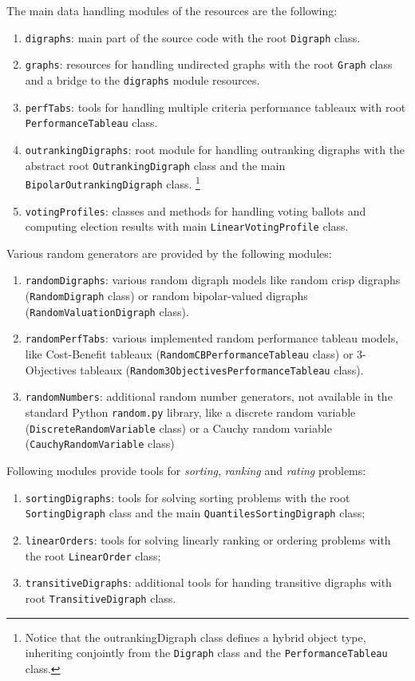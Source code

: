 The main data handling modules of the \Digraph resources are the following:
\begin{enumerate}[leftmargin=0.75cm]
\item \texttt{digraphs}: main part of the \Digraph source code with the root \texttt{Digraph} class.
\item \texttt{graphs}: resources for handling undirected graphs with the root \texttt{Graph} class and a bridge to the \texttt{digraphs} module resources.
\item \texttt{perfTabs}: tools for handling multiple criteria performance tableaux with root \texttt{PerformanceTableau} class.
\item \texttt{outrankingDigraphs}: root module for handling outranking digraphs with the abstract root \texttt{OutrankingDigraph} class and the main \texttt{Bipolar\-OutrankingDigraph} class. \footnote{Notice that the outrankingDigraph class defines a hybrid object type, inheriting conjointly from the \texttt{Digraph} class and the \texttt{PerformanceTableau} class.}
\item \texttt{votingProfiles}: classes and methods for handling voting ballots and computing election results with main \texttt{LinearVotingProfile} class.
\end{enumerate}

\noindent Various random generators are provided by the following modules:
\begin{enumerate}[leftmargin=0.75cm]
\item \texttt{randomDigraphs}: various random digraph models like random crisp digraphs (\texttt{RandomDigraph} class) or random bipolar-valued digraphs (\texttt{Random\-ValuationDigraph} class).
\item \texttt{randomPerfTabs}: various implemented random performance tableau models, like Cost-Benefit tableaux (\texttt{RandomCBPerformance\-Tableau} class) or 3-Objectives tableaux (\texttt{Random3ObjectivesPer\-formance\-Tableau} class).
\item \texttt{randomNumbers}: additional random number generators, not available in the standard Python \texttt{random.py} library, like a discrete random variable (\texttt{DiscreteRandomVariable} class) or a Cauchy random variable (\texttt{Cau\-chy\-RandomVariable} class)
\end{enumerate}

\noindent Following modules provide tools for \emph{sorting}, \emph{ranking} and \emph{rating} problems:
\begin{enumerate}[leftmargin=0.75cm]
\item \texttt{sortingDigraphs}: tools for solving sorting problems with the root \texttt{Sor\-tingDigraph} class and the main \texttt{QuantilesSortingDi\-graph} class;
\item \texttt{linearOrders}: tools for solving linearly ranking or ordering problems with the root \texttt{LinearOrder} class;
\item \texttt{transitiveDigraphs}: additional tools for handing transitive digraphs with root \texttt{TransitiveDigraph} class.
\end{enumerate}

